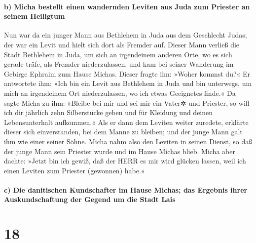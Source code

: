 \hypertarget{b-micha-bestellt-einen-wandernden-leviten-aus-juda-zum-priester-an-seinem-heiligtum}{%
\paragraph{b) Micha bestellt einen wandernden Leviten aus Juda zum
Priester an seinem
Heiligtum}\label{b-micha-bestellt-einen-wandernden-leviten-aus-juda-zum-priester-an-seinem-heiligtum}}

Nun war da ein junger Mann aus Bethlehem in Juda aus dem
Geschlecht Judas; der war ein Levit und hielt sich dort als Fremder auf.
Dieser Mann verließ die Stadt Bethlehem in Juda, um sich
an irgendeinem anderen Orte, wo es sich gerade träfe, als Fremder
niederzulassen, und kam bei seiner Wanderung im Gebirge Ephraim zum
Hause Michas. Dieser fragte ihn: »Woher kommst du?« Er
antwortete ihm: »Ich bin ein Levit aus Bethlehem in Juda und bin
unterwegs, um mich an irgendeinem Ort niederzulassen, wo ich etwas
Geeignetes finde.« Da sagte Micha zu ihm: »Bleibe bei mir
und sei mir ein Vater✲ und Priester, so will ich dir jährlich zehn
Silberstücke geben und für Kleidung und deinen Lebensunterhalt
aufkommen.« Als er dann dem Leviten weiter zuredete,
erklärte dieser sich einverstanden, bei dem Manne zu
bleiben; und der junge Mann galt ihm wie einer seiner Söhne.
Micha nahm also den Leviten in seinen Dienst, so daß der
junge Mann sein Priester wurde und im Hause Michas blieb.
Micha aber dachte: »Jetzt bin ich gewiß, daß der HERR es
mir wird glücken lassen, weil ich einen Leviten zum Priester (gewonnen)
habe.«

\hypertarget{c-die-danitischen-kundschafter-im-hause-michas-das-ergebnis-ihrer-auskundschaftung-der-gegend-um-die-stadt-lais}{%
\paragraph{c) Die danitischen Kundschafter im Hause Michas; das Ergebnis
ihrer Auskundschaftung der Gegend um die Stadt
Lais}\label{c-die-danitischen-kundschafter-im-hause-michas-das-ergebnis-ihrer-auskundschaftung-der-gegend-um-die-stadt-lais}}

\hypertarget{section-17}{%
\section{18}\label{section-17}}

